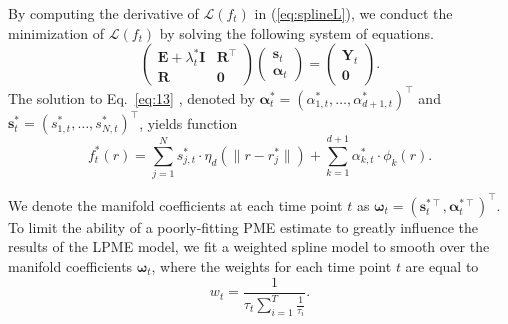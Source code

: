 \documentclass[11pt,reqno]{article}
\newcommand{\T}{\intercal}
\theoremstyle{definition}
\begin{document}
By computing the derivative of $\mathcal{L}(f_t)$ in (\ref{eq:splineL}), we conduct the minimization of $\mathcal{L}(f_t)$ by solving the following system of equations.
\begin{equation}
  \left(
    \begin{array}{cc}
      \boldsymbol{E} + \lambda_t^* \boldsymbol{I} & \boldsymbol{R}^\T \\
      \boldsymbol{R} & \boldsymbol{0}
    \end{array}
  \right)\left(
    \begin{array}{c}
      \boldsymbol{s}_t \\
      \boldsymbol{\alpha}_t
    \end{array}
  \right) = \left(
    \begin{array}{c}
      \boldsymbol{Y}_t \\
      \boldsymbol{0}
    \end{array}
  \right). \label{eq:13}
\end{equation}
The solution to Eq.~\eqref{eq:13} , denoted by $\boldsymbol{\alpha}^*_t=(\alpha^*_{1,t},\ldots,\alpha^*_{d+1,t})^\T$ and $\boldsymbol{s}^*_t=(s^*_{1,t},\ldots,s^*_{N,t})^\T$, yields function
\begin{equation}\nonumber
  f_t^*(r) = \sum_{j=1}^{N}s_{j,t}^* \cdot  \eta_{d}\left(\|r - r_j^*\|\right) + \sum_{k=1}^{d + 1}\alpha_{k,t}^* \cdot \phi_k(r).
\end{equation}

We denote the manifold coefficients at each time point $t$ as $\boldsymbol{\omega}_t = (\boldsymbol{s}_t^{*\T}, \boldsymbol{\alpha}_t^{*\T})^\T$. To limit the ability of a poorly-fitting PME estimate to greatly influence the results of the LPME model, we fit a weighted spline model to smooth over the manifold coefficients $\boldsymbol{\omega}_t$, where the weights for each time point $t$ are equal to
$$w_t = \frac{1}{\tau_t\sum_{i=1}^{T}\frac{1}{\tau_i}}.$$
\end{document}
